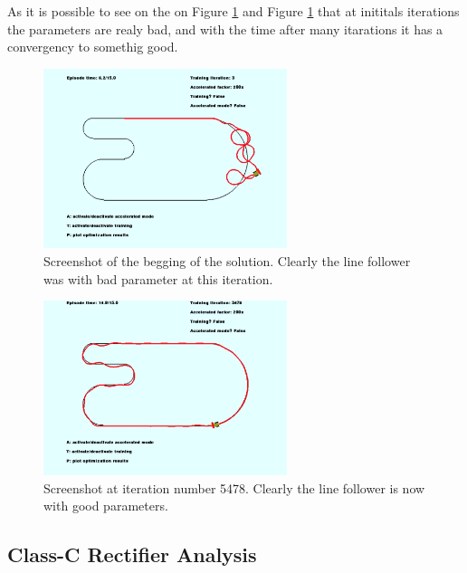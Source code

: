 As it is possible to see on the on Figure \ref{img:initial_line_follower_solution} and Figure \ref{img:initial_line_follower_solution} that at inititals iterations the parameters are realy bad, and with the time after many itarations it has a convergency to somethig good.

\begin{figure}
  \begin{center}
  \includegraphics[width=2.8in]{./../code/results/initial_line_follower_solution.png}
  \caption{Screenshot of the begging of the solution. Clearly the line follower was with bad parameter at this iteration.}
  \label{img:initial_line_follower_solution}
  \end{center}
\end{figure}

\begin{figure}
  \begin{center}
  \includegraphics[width=2.8in]{./../code/results/line_follower_solution.png}
  \caption{Screenshot at iteration number 5478. Clearly the line follower is now with good parameters.}
  \label{img:line_follower_solution}
  \end{center}
\end{figure}





\subsection {Class-C Rectifier Analysis}

